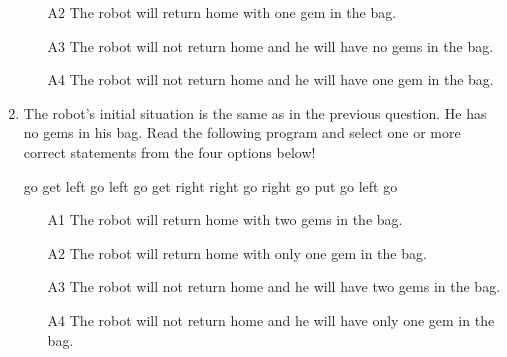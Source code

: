 \begin{enumerate}
\begin{enumerate}
\item[A2] The robot will return home with one gem in the bag.
\item[A3] The robot will not return home and he will have no gems in the bag.
\item[A4] The robot will not return home and he will have one gem in the bag.
\end{enumerate}
\item The robot's initial situation is the same as in the previous question. He has no gems 
in his bag. Read the following program and select one or more correct statements from the four options below!
\begin{bluecode}
go
get
left
go
left
go
get
right
right
go
right
go
put
go
left 
go
\end{bluecode}
\begin{enumerate}
\item[A1] The robot will return home with two gems in the bag.
\item[A2] The robot will return home with only one gem in the bag.
\item[A3] The robot will not return home and he will have two gems in the bag.
\item[A4] The robot will not return home and he will have only one gem in the bag.
\end{enumerate}


\end{enumerate}
